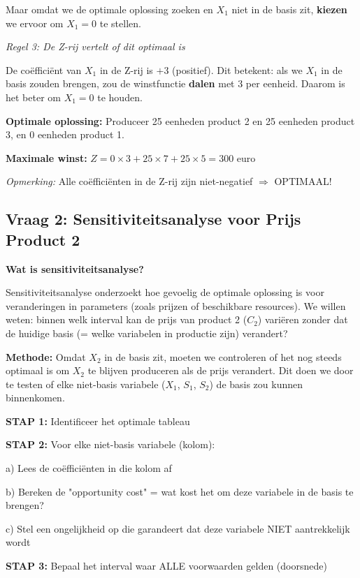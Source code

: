 \documentclass[a4paper,11pt]{article}
\begin{document}
\begin{oefenblok}[title=Productie Optimalisatie bij een Bedrijf]
Maar omdat we de optimale oplossing zoeken en $X_1$ niet in de basis zit, \textbf{kiezen} 
we ervoor om $X_1 = 0$ te stellen.

\textit{Regel 3: De Z-rij vertelt of dit optimaal is}

De coëfficiënt van $X_1$ in de Z-rij is $+3$ (positief). 
Dit betekent: als we $X_1$ in de basis zouden brengen, zou de winstfunctie \textbf{dalen}
 met 3 per eenheid. Daarom is het beter om $X_1 = 0$ te houden.

\vspace{0.3cm}

\textbf{Optimale oplossing:} Produceer 25 eenheden product 2 en 25 eenheden product 3, en 0 eenheden product 1.

\textbf{Maximale winst:} $Z = 0 \times 3 + 25 \times 7 + 25 \times 5 = 300$ euro

\textit{Opmerking:} Alle coëfficiënten in de Z-rij zijn niet-negatief $\Rightarrow$ OPTIMAAL!

\subsection*{Vraag 2: Sensitiviteitsanalyse voor Prijs Product 2}

\textbf{Wat is sensitiviteitsanalyse?}

Sensitiviteitsanalyse onderzoekt hoe gevoelig de optimale oplossing is voor veranderingen in parameters (zoals prijzen of beschikbare resources). We willen weten: binnen welk interval kan de prijs van product 2 ($C_2$) variëren zonder dat de huidige basis (= welke variabelen in productie zijn) verandert?

\textbf{Methode:} Omdat $X_2$ in de basis zit, moeten we controleren of het nog steeds optimaal is om $X_2$ te blijven produceren als de prijs verandert. Dit doen we door te testen of elke niet-basis variabele ($X_1$, $S_1$, $S_2$) de basis zou kunnen binnenkomen.

\vspace{0.3cm}

\begin{warningbox}[title=Stappenplan Sensitiviteitsanalyse voor Basis-variabele]
\textbf{STAP 1:} Identificeer het optimale tableau\par
\textbf{STAP 2:} Voor elke niet-basis variabele (kolom):\par
\quad a) Lees de coëfficiënten in die kolom af\par
\quad b) Bereken de "opportunity cost" = wat kost het om deze variabele in de basis te brengen?\par
\quad c) Stel een ongelijkheid op die garandeert dat deze variabele NIET aantrekkelijk wordt\par
\textbf{STAP 3:} Bepaal het interval waar ALLE voorwaarden gelden (doorsnede)
\end{warningbox}


\end{oefenblok}
\end{document}

